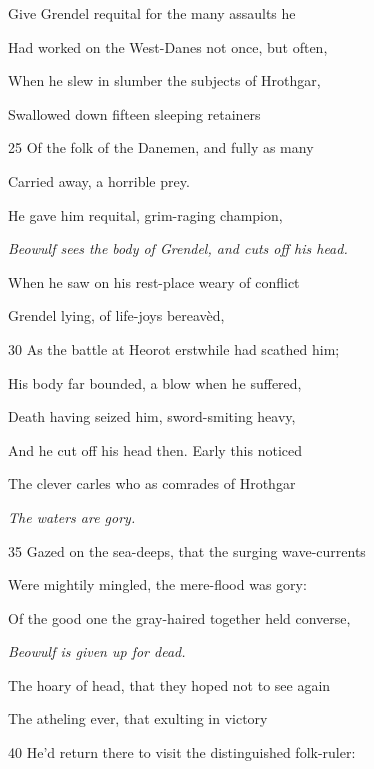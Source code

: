 Give Grendel requital for the many assaults he

Had worked on the West-Danes not once, but often,

When he slew in slumber the subjects of Hrothgar,

Swallowed down fifteen sleeping retainers

25
Of the folk of the Danemen, and fully as many

Carried away, a horrible prey.

He gave him requital, grim-raging champion,

\emph{Beowulf sees the
body of Grendel,
and cuts off his
head.}

When he saw on his rest-place weary of conflict

Grendel lying, of life-joys bereavèd,

30
As the battle at Heorot erstwhile had scathed him;

His body far bounded, a blow when he suffered,

Death having seized him, sword-smiting heavy,

And he cut off his head then. Early this noticed

The clever carles who as comrades of Hrothgar

\emph{The waters are
gory.}

35
Gazed on the sea-deeps, that the surging wave-currents

Were mightily mingled, the mere-flood was gory:

Of the good one the gray-haired together held converse,

\emph{Beowulf is given
up for dead.}

The hoary of head, that they hoped not to see again

The atheling ever, that exulting in victory

40
He’d return there to visit the distinguished folk-ruler:

